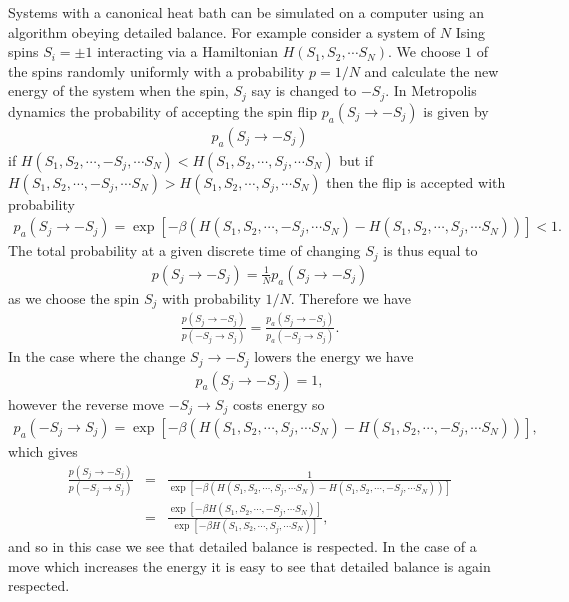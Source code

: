 Systems with a canonical heat bath can be simulated on a computer using an algorithm
obeying detailed balance. For example consider a system of $N$ Ising spins $S_i=\pm1$ interacting via a Hamiltonian $H(S_1, S_2,\cdots S_N)$. We choose $1$ of the spins randomly uniformly with a probability $p=1/N$ and calculate the new energy of the system when the spin, $S_j$ say is changed to $-S_j$. In Metropolis dynamics the probability of accepting the spin flip $p_a(S_j\to -S_j)$ is given by 
\begin{align}
p_a(S_j\to -S_j)
\end{align}
if $H(S_1, S_2,\cdots, -S_j,\cdots S_N) < H(S_1, S_2,\cdots, S_j,\cdots S_N)$ but if $H(S_1, S_2,\cdots, -S_j,\cdots S_N) > H(S_1, S_2,\cdots, S_j,\cdots S_N)$ then the flip is accepted with probability 
\begin{align}
p_a(S_j\to -S_j) = \exp\left[ -\beta\left(H(S_1, S_2,\cdots, -S_j,\cdots S_N) - H(S_1, S_2,\cdots, S_j,\cdots S_N)\right)\right] <1.
\end{align}
The total probability at a given discrete time of changing $S_j$ is thus equal to 
\begin{align}
p(S_j\to -S_j) = \frac{1}{N} p_a(S_j\to -S_j)
\end{align}
as we choose the spin $S_j$ with probability $1/N$. Therefore we have
\begin{align}
\frac{p(S_j\to -S_j)}{p(-S_j\to S_j)} = \frac{p_a(S_j\to -S_j)}{p_a(-S_j\to S_j)}.
\end{align}
In the case where the change $S_j\to -S_j$ lowers the energy we have
\begin{align}
p_a(S_j\to -S_j) =1,
\end{align}
however the reverse move $-S_j\to S_j$ costs energy so 
\begin{align}
p_a(-S_j\to S_j) =\exp\left[ -\beta\left(H(S_1, S_2,\cdots, S_j,\cdots S_N) - H(S_1, S_2,\cdots, -S_j,\cdots S_N)\right)\right],
\end{align}
which gives
\begin{eqnarray}
\frac{p(S_j\to -S_j)}{p(-S_j\to S_j)} &=& \frac{1}{\exp\left[ -\beta\left(H(S_1, S_2,\cdots, S_j,\cdots S_N) - H(S_1, S_2,\cdots, -S_j,\cdots S_N)\right)\right]} \nonumber \\
&=&\frac{ \exp\left[ -\beta H(S_1, S_2,\cdots, -S_j,\cdots S_N)\right]}{\exp\left[ -\beta H(S_1, S_2,\cdots, S_j,\cdots S_N)\right]},
\end{eqnarray}
and so in this case we see that detailed balance is respected. In the case of a move which increases the energy it is easy to see that detailed balance is again respected.  

